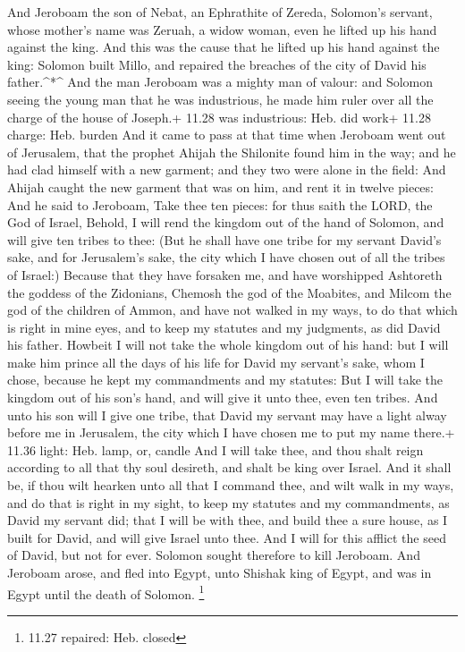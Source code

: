  And Jeroboam the son of Nebat, an Ephrathite of Zereda,
Solomon's servant, whose mother's name was Zeruah, a widow woman, even
he lifted up his hand against the king.  And this was the
cause that he lifted up his hand against the king: Solomon built Millo,
and repaired the breaches of the city of David his father.\^{}*\^{}
 And the man Jeroboam was a mighty man of valour: and
Solomon seeing the young man that he was industrious, he made him ruler
over all the charge of the house of Joseph.+ 11.28 was industrious: Heb.
did work+ 11.28 charge: Heb. burden  And it came to pass at
that time when Jeroboam went out of Jerusalem, that the prophet Ahijah
the Shilonite found him in the way; and he had clad himself with a new
garment; and they two were alone in the field:  And Ahijah
caught the new garment that was on him, and rent it in twelve pieces:
 And he said to Jeroboam, Take thee ten pieces: for thus
saith the LORD, the God of Israel, Behold, I will rend the kingdom out
of the hand of Solomon, and will give ten tribes to thee: 
(But he shall have one tribe for my servant David's sake, and for
Jerusalem's sake, the city which I have chosen out of all the tribes of
Israel:)  Because that they have forsaken me, and have
worshipped Ashtoreth the goddess of the Zidonians, Chemosh the god of
the Moabites, and Milcom the god of the children of Ammon, and have not
walked in my ways, to do that which is right in mine eyes, and to keep
my statutes and my judgments, as did David his father. 
Howbeit I will not take the whole kingdom out of his hand: but I will
make him prince all the days of his life for David my servant's sake,
whom I chose, because he kept my commandments and my statutes:
 But I will take the kingdom out of his son's hand, and
will give it unto thee, even ten tribes.  And unto his son
will I give one tribe, that David my servant may have a light alway
before me in Jerusalem, the city which I have chosen me to put my name
there.+ 11.36 light: Heb. lamp, or, candle  And I will take
thee, and thou shalt reign according to all that thy soul desireth, and
shalt be king over Israel.  And it shall be, if thou wilt
hearken unto all that I command thee, and wilt walk in my ways, and do
that is right in my sight, to keep my statutes and my commandments, as
David my servant did; that I will be with thee, and build thee a sure
house, as I built for David, and will give Israel unto thee.
 And I will for this afflict the seed of David, but not for
ever.  Solomon sought therefore to kill Jeroboam. And
Jeroboam arose, and fled into Egypt, unto Shishak king of Egypt, and was
in Egypt until the death of Solomon. \footnote{11.27 repaired: Heb.
  closed}

